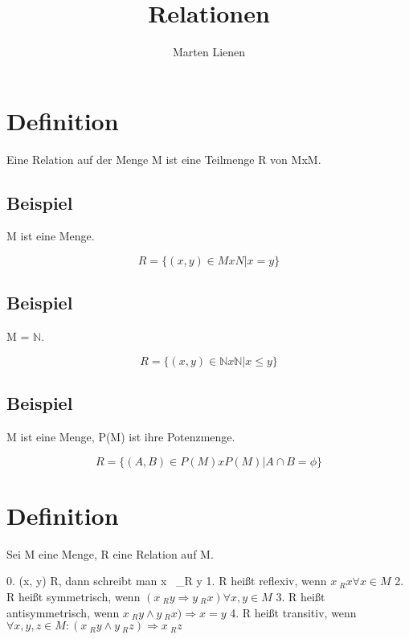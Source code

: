 \documentclass[a4paper,10pt]{article}
\title{Relationen}
\author{Marten Lienen}
\begin{document}
\maketitle

\section{Definition}

Eine Relation auf der Menge M ist eine Teilmenge R von MxM.

\subsection{Beispiel}

M ist eine Menge.

\begin{equation}
 R = \{ (x, y) \in MxN | x = y \}
\end{equation}

\subsection{Beispiel}

M = $\mathbb{N}$.

\begin{equation}
 R = \{ (x, y) \in \mathbb{N}x\mathbb{N} | x \le y \}
\end{equation}

\subsection{Beispiel}

M ist eine Menge, P(M) ist ihre Potenzmenge.

\begin{equation}
 R = \{ (A, B) \in P(M)xP(M) | A \cap B = \phi \}
\end{equation}

\section{Definition}

Sei M eine Menge, R eine Relation auf M.

0. (x, y) \in R, dann schreibt man x ~_R y
1. R heißt reflexiv, wenn $x ~_R x \forall x \in M$
2. R heißt symmetrisch, wenn $(x ~_R y \Rightarrow y ~_R x) \forall x, y \in M$
3. R heißt antisymmetrisch, wenn $x ~_R y \land y ~_R x) \Rightarrow x = y$
4. R heißt transitiv, wenn $\forall x, y, z \in M: (x ~_R y \land y ~_R  z) \Rightarrow x ~_R z$
\end{document}
